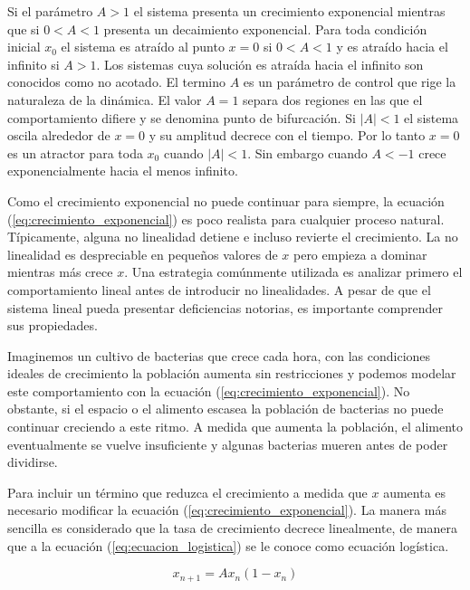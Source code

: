        Si el parámetro $A > 1$ el sistema presenta un crecimiento exponencial mientras que si $0 < A < 1$ presenta un decaimiento exponencial. Para toda condición inicial $x_{0}$ el sistema es atraído al punto $x = 0$ si $0 < A < 1$ y es atraído hacia el infinito si $A > 1$. Los sistemas cuya solución es atraída hacia el infinito son conocidos como no acotado. El termino $A$ es un parámetro de control que rige la naturaleza de la dinámica. El valor $A = 1$ separa dos regiones en las que el comportamiento difiere y se denomina punto de bifurcación. Si $|A| < 1$ el sistema oscila alrededor de $x = 0$ y su amplitud decrece con el tiempo. Por lo tanto $x = 0$ es un atractor para toda $x_{0}$ cuando $|A| < 1$. Sin embargo cuando $A< -1$ crece exponencialmente hacia el menos infinito.

        Como el crecimiento exponencial no puede continuar para siempre, la ecuación (\ref{eq:crecimiento_exponencial}) es poco realista para cualquier proceso natural. Típicamente, alguna no linealidad detiene e incluso revierte el crecimiento. La no linealidad es despreciable en pequeños valores de $x$ pero empieza a dominar mientras más crece $x$. Una estrategia comúnmente utilizada es analizar primero el comportamiento lineal antes de introducir no linealidades. A pesar de que el sistema lineal pueda presentar deficiencias notorias, es importante comprender sus propiedades. 

        Imaginemos un cultivo de bacterias que crece cada hora, con las condiciones ideales de crecimiento la población aumenta sin restricciones y podemos modelar este comportamiento con la ecuación (\ref{eq:crecimiento_exponencial}). No obstante, si el espacio o el alimento escasea la población de bacterias no puede continuar creciendo a este ritmo. A medida que aumenta la población, el alimento eventualmente se vuelve insuficiente y algunas bacterias mueren antes de poder dividirse. 

        Para incluir un término que reduzca el crecimiento a medida que $x$ aumenta es necesario modificar la ecuación (\ref{eq:crecimiento_exponencial}). La manera más sencilla es considerado que la tasa de crecimiento decrece linealmente, de manera que a la ecuación (\ref{eq:ecuacion_logistica}) se le conoce como ecuación logística.
            
       \begin{equation}
            x_{n+1} = A x_{n} (1 - x_{n}) 
            \label{eq:ecuacion_logistica}
       \end{equation}

